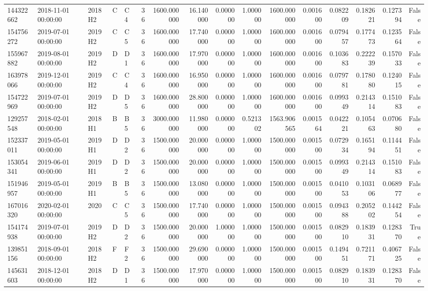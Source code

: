 \begin{tabular}{lllllrrrrrrrrrrr}
144322662 & 2018-11-01 00:00:00 & 2018H2 & C & C4 & 36 & 1600.000000 & 16.140000 & 0.000000 & 1.000000 & 1600.000000 & 0.001600 & 0.082209 & 0.182621 & 0.127394 & False \\
154756272 & 2019-07-01 00:00:00 & 2019H2 & C & C5 & 36 & 1600.000000 & 17.740000 & 0.000000 & 1.000000 & 1600.000000 & 0.001600 & 0.079457 & 0.177473 & 0.123564 & False \\
155967882 & 2019-08-01 00:00:00 & 2019H2 & D & D1 & 36 & 1600.000000 & 17.970000 & 0.000000 & 1.000000 & 1600.000000 & 0.001600 & 0.103683 & 0.222239 & 0.157033 & False \\
163978066 & 2019-12-01 00:00:00 & 2019H2 & C & C4 & 36 & 1600.000000 & 16.950000 & 0.000000 & 1.000000 & 1600.000000 & 0.001600 & 0.079781 & 0.178080 & 0.124015 & False \\
154722969 & 2019-07-01 00:00:00 & 2019H2 & D & D5 & 36 & 1600.000000 & 28.800000 & 0.000000 & 1.000000 & 1600.000000 & 0.001600 & 0.099349 & 0.214314 & 0.151083 & False \\
129257548 & 2018-02-01 00:00:00 & 2018H1 & B & B5 & 36 & 3000.000000 & 11.980000 & 0.000000 & 0.521302 & 1563.906565 & 0.001564 & 0.042221 & 0.105463 & 0.070680 & False \\
152337011 & 2019-05-01 00:00:00 & 2019H1 & D & D2 & 36 & 1500.000000 & 20.000000 & 0.000000 & 1.000000 & 1500.000000 & 0.001500 & 0.072934 & 0.165194 & 0.114451 & False \\
153054341 & 2019-06-01 00:00:00 & 2019H1 & D & D2 & 36 & 1500.000000 & 20.000000 & 0.000000 & 1.000000 & 1500.000000 & 0.001500 & 0.099349 & 0.214314 & 0.151083 & False \\
151946957 & 2019-05-01 00:00:00 & 2019H1 & B & B5 & 36 & 1500.000000 & 13.080000 & 0.000000 & 1.000000 & 1500.000000 & 0.001500 & 0.041053 & 0.103106 & 0.068977 & False \\
167016320 & 2020-02-01 00:00:00 & 2020 & C & C5 & 36 & 1500.000000 & 17.740000 & 0.000000 & 1.000000 & 1500.000000 & 0.001500 & 0.094388 & 0.205202 & 0.144254 & False \\
154174938 & 2019-07-01 00:00:00 & 2019H2 & D & D2 & 36 & 1500.000000 & 20.000000 & 1.000000 & 1.000000 & 1500.000000 & 0.001500 & 0.082910 & 0.183931 & 0.128370 & True \\
139851156 & 2018-09-01 00:00:00 & 2018H2 & F & F2 & 36 & 1500.000000 & 29.690000 & 0.000000 & 1.000000 & 1500.000000 & 0.001500 & 0.149451 & 0.721171 & 0.406725 & False \\
145631603 & 2018-12-01 00:00:00 & 2018H2 & D & D1 & 36 & 1500.000000 & 17.970000 & 0.000000 & 1.000000 & 1500.000000 & 0.001500 & 0.082910 & 0.183931 & 0.128370 & False \\

\end{tabular}
